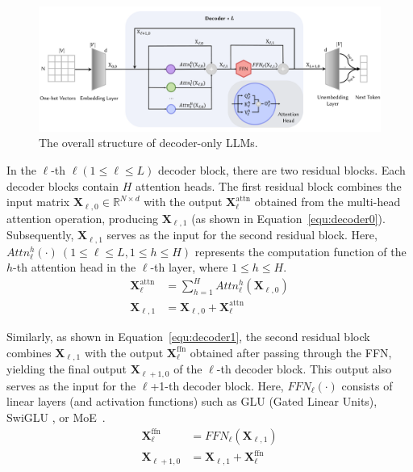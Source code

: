 \documentclass{article}
\begin{document}
\begin{figure}[h!]
    \centering
    \includegraphics[width=\linewidth]{figures/LLMStructure.pdf}
    \caption{The overall structure of decoder-only LLMs.}
    \label{fig:LLMStructure}
\end{figure}

In the $\ell$-th $\ell \left(1\leq \ell \leq L\right)$ decoder block, there are two residual blocks. Each decoder blocks contain $H$ attention heads. The first residual block combines the input matrix $\mathbf{X}_{\ell,0} \in \mathbb{R}^{N \times d}$ with the output $\mathbf{X}_{\ell}^{\text{attn}}$ obtained from the multi-head attention operation, producing $\mathbf{X}_{\ell,1}$ (as shown in Equation~\ref{equ:decoder0}). Subsequently, $\mathbf{X}_{\ell,1}$ serves as the input for the second residual block. Here, $Attn_{\ell}^{h}\left(\cdot\right)\  \left(1\leq \ell \leq L, 1\leq h \leq H\right)$ represents the computation function of the $h$-th attention head in the $\ell$-th layer, where $1 \leq h \leq H$.
\begin{equation} \label{equ:decoder0}
\begin{aligned}
    \mathbf{X}_{\ell}^{\text{attn}} &= \sum_{h=1}^{H}{Attn_{\ell}^{h}}\left(\mathbf{X}_{\ell,0}\right) \\
    \mathbf{X}_{\ell,1} &= \mathbf{X}_{\ell,0} + \mathbf{X}_{\ell}^{\text{attn}}
\end{aligned}
\end{equation}

Similarly, as shown in Equation~\ref{equ:decoder1}, the second residual block combines $\mathbf{X}_{\ell,1}$ with the output $\mathbf{X}_{\ell}^{\text{ffn}}$ obtained after passing through the FFN, yielding the final output $\mathbf{X}_{\ell+1,0}$ of the $\ell$-th decoder block. This output also serves as the input for the $\ell$+1-th decoder block. Here, $FFN_{\ell}\left(\cdot\right)$ consists of linear layers (and activation functions) such as GLU (Gated Linear Units), SwiGLU \citep{GLU_2020_arXiv_Google}, or MoE~\citep{MOETransformer}.
\begin{equation} \label{equ:decoder1}
\begin{aligned}
    \mathbf{X}_{\ell}^{\text{ffn}} &= FFN_{\ell}\left(\mathbf{X}_{\ell,1}\right) \\
    \mathbf{X}_{\ell+1,0} &= \mathbf{X}_{\ell,1} + \mathbf{X}_{\ell}^{\text{ffn}}
\end{aligned}
\end{equation}
\end{document}
